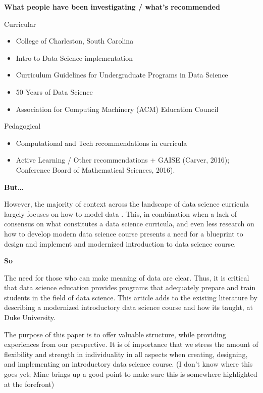 \documentclass[
  12pt]{article}
\begin{document}
\textbf{What people have been investigating / what's recommended}

Curricular

\begin{itemize}
\item
  College of Charleston, South Carolina \citep{Anderson2014}
\item
  Intro to Data Science implementation \citep{Asamoah2015}
\item
  Curriculum Guidelines for Undergraduate Programs in Data Science
  \citep{veaux_2017}
\item
  50 Years of Data Science \citep{Donoho_2017}
\item
  Association for Computing Machinery (ACM) Education Council
  \citep{Danyluk_2021}
\end{itemize}

Pedagogical

\begin{itemize}
\item
  Computational and Tech recommendations in curricula
  \citep{Donoho_2017, Beckman_2021}
\item
  Active Learning / Other recommendations
  \citep{Dogucu_2022, CetinkayaRundel_2022} + GAISE (Carver, 2016);
  Conference Board of Mathematical Sciences, 2016).
\end{itemize}

\textbf{But\ldots{}}

However, the majority of context across the landscape of data science
curricula largely focuses on how to model data \citep{Donoho2017}. This,
in combination when a lack of consensus on what constitutes a data
science curricula, and even less research on how to develop modern data
science course presents a need for a blueprint to design and implement
and modernized introduction to data science course.

\textbf{So}

The need for those who can make meaning of data are clear. Thus, it is
critical that data science education provides programs that adequately
prepare and train students in the field of data science. This article
adds to the existing literature by describing a modernized introductory
data science course and how its taught, at Duke University.

The purpose of this paper is to offer valuable structure, while
providing experiences from our perspective. It is of importance that we
stress the amount of flexibility and strength in individuality in all
aspects when creating, designing, and implementing an introductory data
science course. (I don't know where this goes yet; Mine brings up a good
point to make sure this is somewhere highlighted at the forefront)
\end{document}
